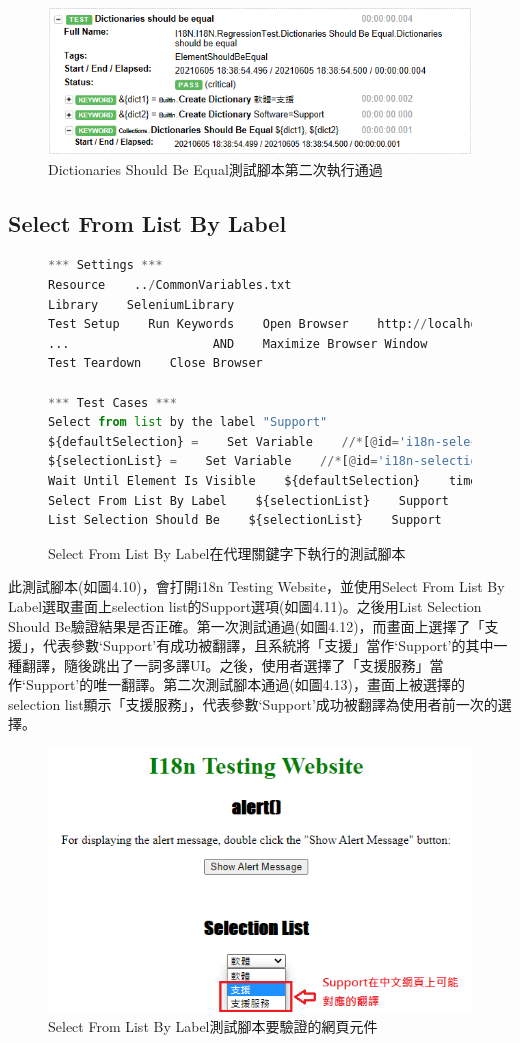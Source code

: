 \begin{figure}[H]
\includegraphics[width= \textwidth]{../論文截圖/4.1.3-3 dictionaries should be equal 2nd run.png}
\caption{Dictionaries Should Be Equal測試腳本第二次執行通過}
\end{figure}

\subsection{Select From List By Label}
\begin{figure}[H]
\begin{lstlisting}[language={python}]
*** Settings ***
Resource    ../CommonVariables.txt
Library    SeleniumLibrary
Test Setup    Run Keywords    Open Browser    http://localhost:3000    Chrome
...                    AND    Maximize Browser Window
Test Teardown    Close Browser

*** Test Cases ***
Select from list by the label "Support"
${defaultSelection} =    Set Variable    //*[@id='i18n-selection-list']//*[text()='Software' and @selected]
${selectionList} =    Set Variable    //*[@id='i18n-selection-list']
Wait Until Element Is Visible    ${defaultSelection}    timeout=${shortPeriodOfTime}
Select From List By Label    ${selectionList}    Support
List Selection Should Be    ${selectionList}    Support
\end{lstlisting}
\caption{Select From List By Label在代理關鍵字下執行的測試腳本}
\end{figure}
此測試腳本(如圖4.10)，會打開i18n Testing Website，並使用Select From List By Label選取畫面上selection list的Support選項(如圖4.11)。之後用List Selection Should Be驗證結果是否正確。第一次測試通過(如圖4.12)，而畫面上選擇了「支援」，代表參數‘Support’有成功被翻譯，且系統將「支援」當作‘Support’的其中一種翻譯，隨後跳出了一詞多譯UI。之後，使用者選擇了「支援服務」當作‘Support’的唯一翻譯。第二次測試腳本通過(如圖4.13)，畫面上被選擇的selection list顯示「支援服務」，代表參數‘Support’成功被翻譯為使用者前一次的選擇。

\begin{figure}[H]
\centering
\includegraphics[width= .6\textwidth]{../論文截圖/4-1-7 Select from list by label要驗證的網頁元件.png}
\caption{Select From List By Label測試腳本要驗證的網頁元件}
\end{figure}

